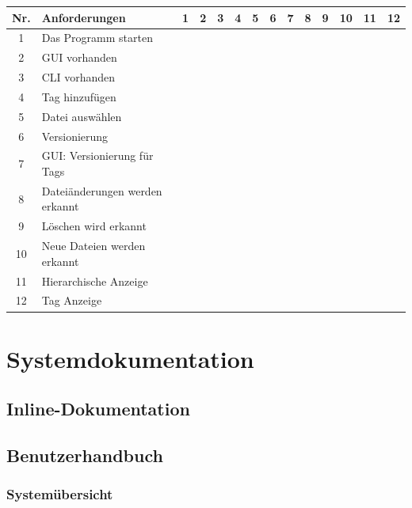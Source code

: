 \documentclass[10pt,paper=a4,final]{scrartcl}
\begin{document}
\begin{tabularx}{\textwidth}{|c|X|c|c|c|c|c|c|c|c|c|c|c|c|}
  \hline
  \bf Nr. & \bf Anforderungen &\bf 1 &\bf 2 &\bf 3 &\bf 4 &\bf 5 &\bf 6 &\bf 7 &\bf 8 &\bf 9 &\bf 10 &\bf 11 &\bf 12 \\ \hline
  1 & Das Programm starten & \cellcolor[gray]{0.7} & & & & & & & & & & & \\ \hline
  2 & GUI vorhanden & & & & & & & & \cellcolor[gray]{0.7} &\cellcolor[gray]{0.7} &\cellcolor[gray]{0.7} &\cellcolor[gray]{0.7} & \\ \hline
  3 & CLI vorhanden & & & &\cellcolor[gray]{0.7} & & & & & & & & \\ \hline
  4 & Tag hinzuf\"ugen & & & &\cellcolor[gray]{0.7} &\cellcolor[gray]{0.7} & & & &\cellcolor[gray]{0.7} & & & \\ \hline
  5 & Datei ausw\"ahlen & & & & & & \cellcolor[gray]{0.7} & & & & & & \cellcolor[gray]{0.7} \\ \hline
  6 & Versionierung & & \cellcolor[gray]{0.7} & & & & \cellcolor[gray]{0.7} & \cellcolor[gray]{0.7} & & & & & \cellcolor[gray]{0.7} \\ \hline
  7 & GUI: Versionierung f\"ur Tags & & & & & & & & \cellcolor[gray]{0.7} & & & & \\ \hline
  8 & Datei\"anderungen werden erkannt & & & & & & & & \cellcolor[gray]{0.7} & & & & \\ \hline
  9 & L\"oschen wird erkannt & & & & & & & & \cellcolor[gray]{0.7} & & & & \\ \hline
  10 & Neue Dateien werden erkannt & & & & & & & & \cellcolor[gray]{0.7} & & & & \\ \hline
  11 & Hierarchische Anzeige & & & & & & & & & & & \cellcolor[gray]{0.7} & \\ \hline
  12 & Tag Anzeige & & & & & & & & & \cellcolor[gray]{0.7} & & & \\ \hline
\end{tabularx}
\section{Systemdokumentation}
\subsection{Inline-Dokumentation}
\subsection{Benutzerhandbuch}
\subsubsection{System\"ubersicht}
\end{document}
